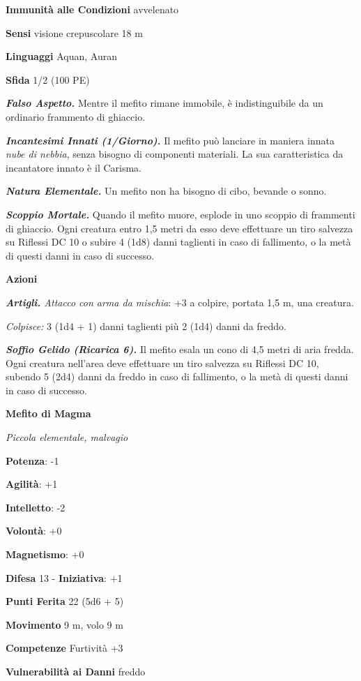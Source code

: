 \begin{multicols}{2}
\textbf{Immunità alle Condizioni} avvelenato

\textbf{Sensi} visione crepuscolare 18 m

\textbf{Linguaggi} Aquan, Auran

\textbf{Sfida} 1/2 (100 PE)

\emph{\textbf{Falso Aspetto.}} Mentre il mefito rimane immobile, è
indistinguibile da un ordinario frammento di ghiaccio.

\emph{\textbf{Incantesimi Innati (1/Giorno).}} Il mefito può lanciare in
maniera innata \emph{nube di nebbia}, senza bisogno di componenti
materiali. La sua caratteristica da incantatore innato è il Carisma.

\emph{\textbf{Natura Elementale.}} Un mefito non ha bisogno di cibo,
bevande o sonno.

\emph{\textbf{Scoppio Mortale.}} Quando il mefito muore, esplode in uno
scoppio di frammenti di ghiaccio. Ogni creatura entro 1,5 metri da esso
deve effettuare un tiro salvezza su Riflessi DC 10 o subire 4 (1d8)
danni taglienti in caso di fallimento, o la metà di questi danni in caso
di successo.

\textbf{Azioni}

\emph{\textbf{Artigli.} Attacco con arma da mischia}: +3 a colpire,
portata 1,5 m, una creatura.

\emph{Colpisce:} 3 (1d4 + 1) danni taglienti più 2 (1d4) danni da
freddo.

\emph{\textbf{Soffio Gelido (Ricarica 6).}} Il mefito esala un cono di
4,5 metri di aria fredda. Ogni creatura nell'area deve effettuare un
tiro salvezza su Riflessi DC 10, subendo 5 (2d4) danni da freddo in
caso di fallimento, o la metà di questi danni in caso di successo.

\textbf{Mefito di Magma}

\emph{Piccola elementale, malvagio}

\textbf{Potenza}: -1

\textbf{Agilità}: +1

\textbf{Intelletto}: -2

\textbf{Volontà}: +0

\textbf{Magnetismo}: +0

\textbf{Difesa} 13 - \textbf{Iniziativa}: +1

\textbf{Punti Ferita} 22 (5d6 + 5)

\textbf{Movimento} 9 m, volo 9 m

\textbf{Competenze} Furtività +3

\textbf{Vulnerabilità ai Danni} freddo


\end{multicols}
